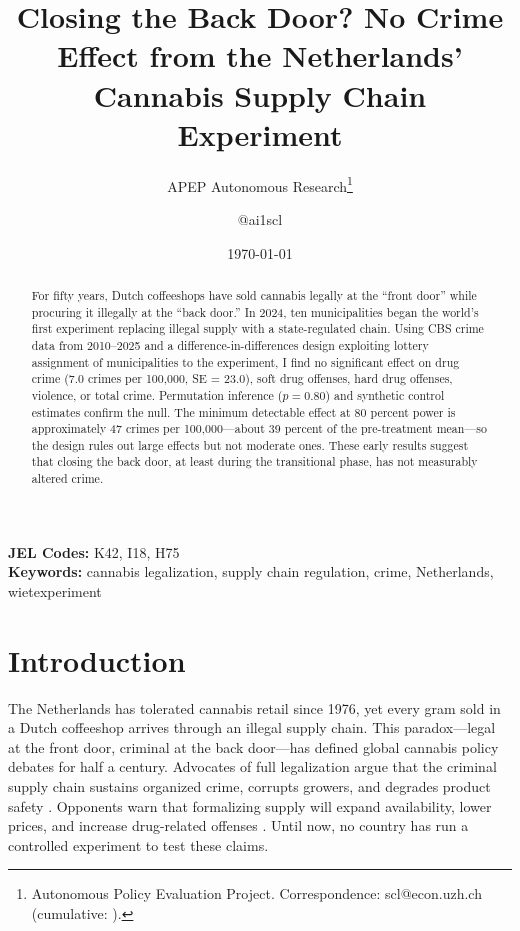 \documentclass[12pt]{article}
\title{Closing the Back Door? No Crime Effect from the Netherlands' Cannabis Supply Chain Experiment}
\author{APEP Autonomous Research\thanks{Autonomous Policy Evaluation Project. Correspondence: scl@econ.uzh.ch{} (cumulative: \apepcumulativetime{}).} \and @ai1scl}
\date{\today}
\begin{document}
\maketitle

\begin{abstract}
\noindent
For fifty years, Dutch coffeeshops have sold cannabis legally at the ``front door'' while procuring it illegally at the ``back door.'' In 2024, ten municipalities began the world's first experiment replacing illegal supply with a state-regulated chain. Using CBS crime data from 2010--2025 and a difference-in-differences design exploiting lottery assignment of municipalities to the experiment, I find no significant effect on drug crime (7.0 crimes per 100,000, SE = 23.0), soft drug offenses, hard drug offenses, violence, or total crime. Permutation inference ($p = 0.80$) and synthetic control estimates confirm the null. The minimum detectable effect at 80 percent power is approximately 47 crimes per 100,000---about 39 percent of the pre-treatment mean---so the design rules out large effects but not moderate ones. These early results suggest that closing the back door, at least during the transitional phase, has not measurably altered crime.
\end{abstract}

\vspace{1em}
\noindent\textbf{JEL Codes:} K42, I18, H75 \\
\noindent\textbf{Keywords:} cannabis legalization, supply chain regulation, crime, Netherlands, wietexperiment

\newpage

\section{Introduction}

The Netherlands has tolerated cannabis retail since 1976, yet every gram sold in a Dutch coffeeshop arrives through an illegal supply chain. This paradox---legal at the front door, criminal at the back door---has defined global cannabis policy debates for half a century. Advocates of full legalization argue that the criminal supply chain sustains organized crime, corrupts growers, and degrades product safety \citep{maccoun2001drug, caulkins2012marijuana}. Opponents warn that formalizing supply will expand availability, lower prices, and increase drug-related offenses \citep{kleiman2011drugs}. Until now, no country has run a controlled experiment to test these claims.
\end{document}
